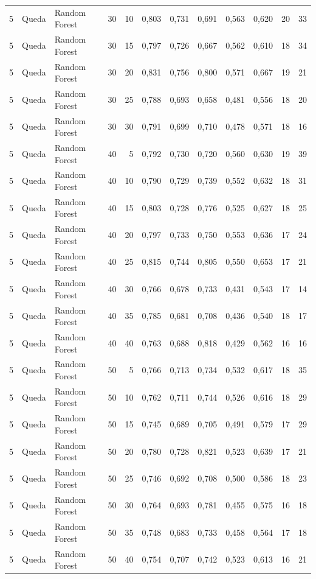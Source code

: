 \begin{longtable}{@{}rllrrrrrrrrr@{}}
5 & Queda & Random Forest & 30 & 10 & 0,803 & 0,731 & 0,691 & 0,563 & 0,620 & 20 & 33 \\
5 & Queda & Random Forest & 30 & 15 & 0,797 & 0,726 & 0,667 & 0,562 & 0,610 & 18 & 34 \\
5 & Queda & Random Forest & 30 & 20 & 0,831 & 0,756 & 0,800 & 0,571 & 0,667 & 19 & 21 \\
5 & Queda & Random Forest & 30 & 25 & 0,788 & 0,693 & 0,658 & 0,481 & 0,556 & 18 & 20 \\
5 & Queda & Random Forest & 30 & 30 & 0,791 & 0,699 & 0,710 & 0,478 & 0,571 & 18 & 16 \\
5 & Queda & Random Forest & 40 & 5 & 0,792 & 0,730 & 0,720 & 0,560 & 0,630 & 19 & 39 \\
5 & Queda & Random Forest & 40 & 10 & 0,790 & 0,729 & 0,739 & 0,552 & 0,632 & 18 & 31 \\
5 & Queda & Random Forest & 40 & 15 & 0,803 & 0,728 & 0,776 & 0,525 & 0,627 & 18 & 25 \\
5 & Queda & Random Forest & 40 & 20 & 0,797 & 0,733 & 0,750 & 0,553 & 0,636 & 17 & 24 \\
5 & Queda & Random Forest & 40 & 25 & 0,815 & 0,744 & 0,805 & 0,550 & 0,653 & 17 & 21 \\
5 & Queda & Random Forest & 40 & 30 & 0,766 & 0,678 & 0,733 & 0,431 & 0,543 & 17 & 14 \\
5 & Queda & Random Forest & 40 & 35 & 0,785 & 0,681 & 0,708 & 0,436 & 0,540 & 18 & 17 \\
5 & Queda & Random Forest & 40 & 40 & 0,763 & 0,688 & 0,818 & 0,429 & 0,562 & 16 & 16 \\
5 & Queda & Random Forest & 50 & 5 & 0,766 & 0,713 & 0,734 & 0,532 & 0,617 & 18 & 35 \\
5 & Queda & Random Forest & 50 & 10 & 0,762 & 0,711 & 0,744 & 0,526 & 0,616 & 18 & 29 \\
5 & Queda & Random Forest & 50 & 15 & 0,745 & 0,689 & 0,705 & 0,491 & 0,579 & 17 & 29 \\
5 & Queda & Random Forest & 50 & 20 & 0,780 & 0,728 & 0,821 & 0,523 & 0,639 & 17 & 21 \\
5 & Queda & Random Forest & 50 & 25 & 0,746 & 0,692 & 0,708 & 0,500 & 0,586 & 18 & 23 \\
5 & Queda & Random Forest & 50 & 30 & 0,764 & 0,693 & 0,781 & 0,455 & 0,575 & 16 & 18 \\
5 & Queda & Random Forest & 50 & 35 & 0,748 & 0,683 & 0,733 & 0,458 & 0,564 & 17 & 18 \\
5 & Queda & Random Forest & 50 & 40 & 0,754 & 0,707 & 0,742 & 0,523 & 0,613 & 16 & 21 \\

\end{longtable}
